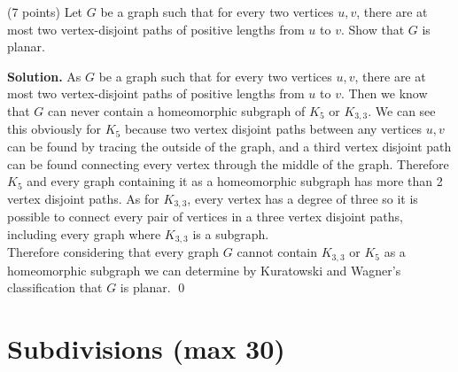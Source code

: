 \documentclass[a4paper,11pt]{amsart}
\newcounter{temp}
\newcounter{prob_counter}
\newenvironment{problem}
{\begin{list}{{\bf \arabic{prob_counter}}}{
      \usecounter{prob_counter}
      \addtolength{\labelsep}{.6ex}
      \addtolength{\itemsep}{4.3ex}
      \setlength{\leftmargin}{1.4em}}
      \setcounter{prob_counter}{\value{temp}}
}
{\setcounter{temp}{\value{prob_counter}}  
  \end{list}
}
\newenvironment{solution}{\textbf{Solution.}}{\qed}
\begin{document}
\begin{problem}
 \item (7 points) Let $G$ be a graph such that for every two vertices $u,v$, there are at most two vertex-disjoint paths of positive
 lengths from $u$ to $v$. Show that $G$ is planar. 
\end{problem}
\begin{solution}
	As $G$ be a graph such that for every two vertices $u,v$, there are at most two vertex-disjoint paths of positive
 lengths from $u$ to $v$.
 	Then we know that $G$ can never contain a homeomorphic subgraph of $K_5 $ or $K_{3, 3}$.
	We can see this obviously for $K_5$ because two vertex disjoint paths between any vertices $u, v$ can
	be found by tracing the outside of the graph, and a third vertex disjoint path can be found connecting every vertex 
	through the middle of the graph. 
	Therefore $K_5$ and every graph containing it as a homeomorphic subgraph has more than 2 vertex disjoint paths. 
	As for $K_{3, 3}$, every vertex has a degree of three so it is possible to connect every pair of 
	vertices in a three vertex disjoint paths, including every graph where $K_{3, 3}$ is a subgraph.\\ 
	Therefore considering that every graph $G$ cannot contain $K_{3, 3}$ or $K_5$ as a homeomorphic subgraph
	we can determine by Kuratowski and Wagner's classification that $G$ is planar. 
\end{solution}



\section{Subdivisions ({\bf max 30})}
\end{document}
